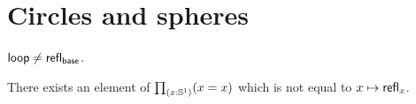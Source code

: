 \documentclass[hott-all.tex]{subfiles}
\begin{document}
\section{Circles and spheres}
% 
% 
% 
\begin{lem}
  $\mathsf{loop}\neq\mathsf{refl}_{\mathsf{base}}$.
\end{lem}
% 
% 
\begin{lem}
  There exists an element of $\prd{x:\Sn^1} (x=x)$ which is not equal to $x\mapsto \mathsf{refl}_{x}$.
\end{lem}
% 
\end{document}
